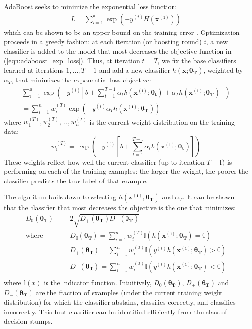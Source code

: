 \documentclass[
   technote
]{phildoc}
\begin{document}
AdaBoost seeks to minimize the exponential loss function:
\begin{eqnarray}
L = \sum_{i=1}^n \exp\left(-y^{(i)} H(\bm{x^{(i)}})\right)
\label{eqn:adaboost_exp_loss}
\end{eqnarray}
which can be shown to be an upper bound on the training error \cite{Freund:2009}.  Optimization proceeds in a greedy fashion: at each iteration (or boosting round) $t$, a new classifier is added to the model that most decreases the objective function in (\ref{eqn:adaboost_exp_loss}).  Thus, at iteration $t=T$, we fix the base classifiers learned at iterations $1,\dots,T-1$ and add a new classifier $h(\bm{x}; \bm{\theta_T})$, weighted by $\alpha_T$, that minimizes the exponential loss objective:
\begin{eqnarray}
\sum_{i=1}^n \exp\left(-y^{(i)}\left[b + \sum_{t=1}^{T-1} \alpha_t h(\bm{x^{(i)}}; \bm{\theta_t}) + \alpha_{T} h(\bm{x^{(i)}}; \bm{\theta_T})\right]\right) \\
= \sum_{i=1}^n w_i^{(T)} \exp\left(-y^{(i)} \alpha_T h(\bm{x^{(i)}}; \bm{\theta_T})\right) \label{eqn:adaboost_T}
\end{eqnarray}
where $w_1^{(T)},w_2^{(T)},\dots,w_n^{(T)}$ is the current weight distribution on the training data:
\begin{equation}
w_i^{(T)} = \exp\left(-y^{(i)}\left[b + \sum_{t=1}^{T-1} \alpha_t h(\bm{x^{(i)}}; \bm{\theta_t})\right]\right)
\end{equation}
These weights reflect how well the current classifier (up to iteration $T-1$) is performing on each of the training examples:  the larger the weight, the poorer the classifier predicts the true label of that example.

The algorithm boils down to selecting $h(\bm{x^{(i)}}; \bm{\theta_T})$ and $\alpha_T$.  It can be shown \cite{Schapire:1999} that the classifier that most decreases the objective is the one that minimizes:
\begin{eqnarray}
D_0(\bm{\theta_T}) &+& 2\sqrt{D_{+}(\bm{\theta_T})D_{-}(\bm{\theta_T})} \label{eqn:clf_selection_criterion} \\ 
\text{where} & & D_0(\bm{\theta_T}) = \sum_{i=1}^n w_i^{(T)} \mathbb{I}(h(\bm{x^{(i)}};\bm{\theta_T}) = 0) \\
			 & & D_{+}(\bm{\theta_T}) = \sum_{i=1}^n w_i^{(T)} \mathbb{I}(y^{(i)}h(\bm{x^{(i)}};\bm{\theta_T}) > 0) \\
			 & & D_{-}(\bm{\theta_T}) = \sum_{i=1}^n w_i^{(T)} \mathbb{I}(y^{(i)}h(\bm{x^{(i)}};\bm{\theta_T}) < 0) \\
\end{eqnarray}
where $\mathbb{I}(x)$ is the indicator function.  Intuitively, $D_0(\bm{\theta_T})$, $D_{+}(\bm{\theta_T})$ and $D_{-}(\bm{\theta_T})$ are the fraction of examples (under the current training weight distribution) for which the classifier abstains, classifies correctly, and classifies incorrectly.
This best classifier can be identified efficiently from the class of decision stumps.
\end{document}
